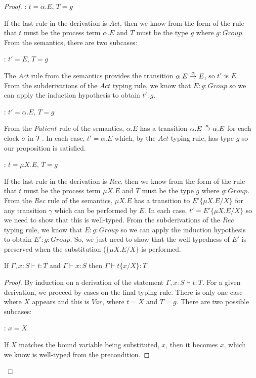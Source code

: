 \begin{proof}
: $t = \alpha.E$, $T = g$

\noindent If the last rule in the derivation is $Act$, then we know
from the form of the rule that $t$ must be the process term
$\alpha.E$ and $T$ must be the type $g$ where $g : Group$.  From
the semantics, there are two subcases:

: $t' = E$, $T = g$

\noindent The $Act$ rule from the semantics provides the transition
$\alpha.E \stackrel{\alpha}{\rightarrow} E$, so $t'$ is $E$.  From the
subderivations of the $Act$ typing rule, we know that $E : g : Group$
so we can apply the induction hypothesis to obtain $t' : g$.

: $t' = \alpha.E$, $T = g$

\noindent From the $Patient$ rule of the semantics, $\alpha.E$ has a transition
$\alpha.E \stackrel{\sigma}{\rightarrow} \alpha.E$ for each clock $\sigma$ in
$\text{$\mathcal{T}$}$.  In each case, $t' = \alpha.E$ which, by the $Act$ typing
rule, has type $g$ so our proposition is satisfied.

: $t = \mu X.E$, $T = g$

\noindent If the last rule in the derivation is $Rec$, then we know
from the form of the rule that $t$ must be the process term $\mu X.E$
and $T$ must be the type $g$ where $g : Group$.  From the $Rec$ rule
of the semantics, $\mu X.E$ has a transition to $E'\{\mu X.E/X\}$ for
any transition $\gamma$ which can be performed by $E$.  In each case,
$t' = E'\{\mu X.E/X\}$ so we need to show that this is well-typed.
From the subderivations of the $Rec$ typing rule, we know that $E : g
: Group$ so we can apply the induction hypothesis to obtain $E' : g :
Group$.  So, we just need to show that the well-typedness of $E'$ is
preserved when the substitution ($\{\mu X.E/X\}$ is performed.

\begin{lemma}
If $\Gamma, x : S \vdash t : T$ and $\Gamma \vdash x : S$ then $\Gamma \vdash t\{x/X\} : T$
\end{lemma}

\begin{proof}
By induction on a derivation of the statement $\Gamma, x : S \vdash t
: T$.  For a given derivation, we proceed by cases on the final typing
rule.  There is only one case where $X$ appears and this is $Var$,
where $t = X$ and $T = g$.  There are two possible subcases:

: $x = X$

\noindent If $X$ matches the bound variable being substituted, $x$, then it
becomes $x$, which we know is well-typed from the precondition.
  

\end{proof}
\end{proof}
